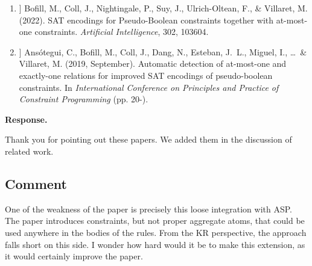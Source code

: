 \documentclass[11pt]{article}
\theoremstyle{definition}
\newcommand{\revieweranswered}{\subsection{Comment}}
\newenvironment{response}{
    \color{blue} \textbf{Response.}
}{
}
\begin{document}
\begin{enumerate}
\item[[1]] Bofill, M., Coll, J., Nightingale, P., Suy, J., Ulrich-Oltean, F., \& Villaret, M. (2022).
SAT encodings for Pseudo-Boolean constraints together with at-most-one constraints.
\textit{Artificial Intelligence}, 302, 103604.
\item[[2]] Ans\'{o}tegui, C., Bofill, M., Coll, J., Dang, N., Esteban, J.~L., Miguel, I., \ldots\ \& Villaret, M. (2019, September).
Automatic detection of at-most-one and exactly-one relations for improved SAT encodings of pseudo-boolean constraints.
In \textit{International Conference on Principles and Practice of Constraint Programming} (pp. 20-).
\end{enumerate}

\begin{response}
Thank you for pointing out these papers.
We added them in the discussion of related work.

\end{response} 

\vspace{0.5cm}

\revieweranswered
One of the weakness of the paper is precisely this loose integration with ASP.
The paper introduces constraints, but not proper aggregate atoms, that could be used
anywhere in the bodies of the rules.
From the KR perspective, the approach falls short on this side.
I wonder how hard would it be to make this extension, as it would certainly improve the paper.
\end{document}
